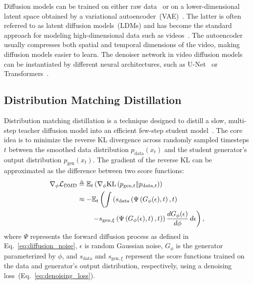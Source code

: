 Diffusion models can be trained on either raw data~\cite{ho2020denoising,jabri2022scalable,karras2022elucidating} or on a lower-dimensional latent space obtained by a variational autoencoder~(VAE)~\cite{rombach2022high,peebles2023scalable,karras2024analyzing,yang2024cogvideox,opensora}.
The latter is often referred to as latent diffusion models~(LDMs) and has become the standard approach for modeling high-dimensional data such as videos~\cite{zhou2022magicvideo,opensora,hong2022cogvideo,blattmann2023align,yang2024cogvideox}. 
The autoencoder usually compresses both spatial and temporal dimensions of the video, making diffusion models easier to learn. The denoiser network %
in video diffusion models can be instantiated by different neural architectures, such as U-Net~\cite{ronneberger2015u,ho2022video,zhou2022magicvideo,chen2023videocrafter1} or Transformers~\cite{vaswani2017attention,hong2022cogvideo,yang2024cogvideox,videoworldsimulators2024}.

\subsection{Distribution Matching Distillation}
\label{sec:dmd}
Distribution matching distillation is a technique designed to distill a slow, multi-step teacher diffusion model into an efficient few-step student model~\cite{yin2024improved, yin2024onestep}. 
The core idea is to minimize the reverse KL divergence across randomly sampled timesteps $t$ between the smoothed data distribution $p_{\text{data}}(x_{t})$ and the student generator's output distribution $p_{\text{gen}}(x_{t})$. 
The gradient of the reverse KL can be approximated as the difference between two score functions:
\begin{align}
\label{eq:dmd}
\nabla_{\phi} \mathcal{L}_{\text{DMD}} & \triangleq \mathbb{E}_{t} \left( \nabla_{\phi} \text{KL} \left( p_{\text{gen}, t} \| p_{\text{data}, t} \right) \right) \notag \\
& \approx - \mathbb{E}_{t} \left( \int \left( s_{\text{data}} \left( \Psi \left( G_{\phi}(\epsilon), t \right), t \right) \right. \right. \\ 
& \qquad \left. \left. - s_{\text{gen},\xi} \left( \Psi \left( G_{\phi}(\epsilon), t \right), t \right) \right) \frac{d G_{\phi}(\epsilon)}{d \phi} \, d\epsilon \right), \notag 
\label{eq:dmd}
\end{align}
where $\Psi$ represents the forward diffusion process as defined in Eq.~\ref{eq:diffusion_noise}, $\epsilon$ is random Gaussian noise, $G_{\phi}$ is the generator parameterized by $\phi$, and $s_{\text{data}}$ and $s_{\text{gen},\xi}$ represent the score functions trained on the data and generator's output distribution, respectively, using a denoising loss~(Eq.~\ref{eq:denoising_loss}). 

